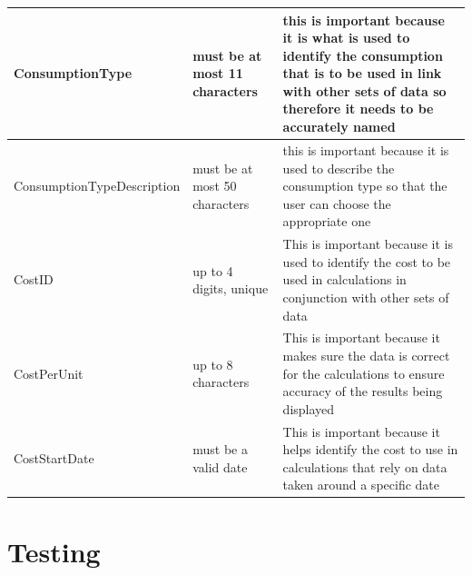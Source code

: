 \begin{center}
\begin{tabular}{|p{3cm}|p{5cm}|p{5cm}|}
        ConsumptionType & must be at most 11 characters & this is important because it is what is used to identify the consumption that is to be used in link with other sets of data so therefore it needs to be accurately named \\ \hline
        ConsumptionTypeDescription & must be at most 50 characters & this is important because it is used to describe the consumption type so that the user can choose the appropriate one \\ \hline
        CostID & up to 4 digits, unique & This is important because it is used to identify the cost to be used in calculations in conjunction with other sets of data \\ \hline
        CostPerUnit & up to 8 characters & This is important because it makes sure the data is correct for the calculations to ensure accuracy of the results being displayed \\ \hline
        CostStartDate & must be a valid date & This is important because it helps identify the cost to use in calculations that rely on data taken around a specific date  \\ \hline
    \end{tabular}
\end{center}

\section{Testing}

